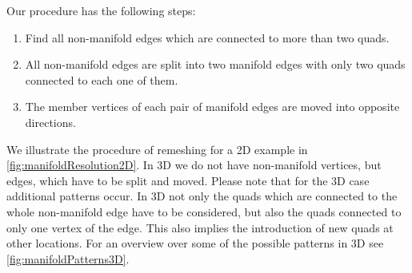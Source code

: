 Our procedure has the following steps:
\begin{enumerate}
\item Find all non-manifold edges which are connected to more than two \acp{quad}.
\item All non-manifold edges are split into two manifold edges with only two \acp{quad} connected to each one of them.
\item The member vertices of each pair of manifold edges are moved into opposite directions. 
\end{enumerate}
We illustrate the procedure of remeshing for a 2D example in \autoref{fig:manifoldResolution2D}. 
In 3D we do not have non-manifold vertices, but edges, which have to be split and moved. Please note that for the 3D case additional patterns occur. In 3D not only the \acp{quad} which are connected to the whole non-manifold edge have to be considered, but also the \acp{quad} connected to only one vertex of the edge. This also implies the introduction of new \acp{quad} at other locations. For an overview over some of the possible patterns in 3D see \autoref{fig:manifoldPatterns3D}.

